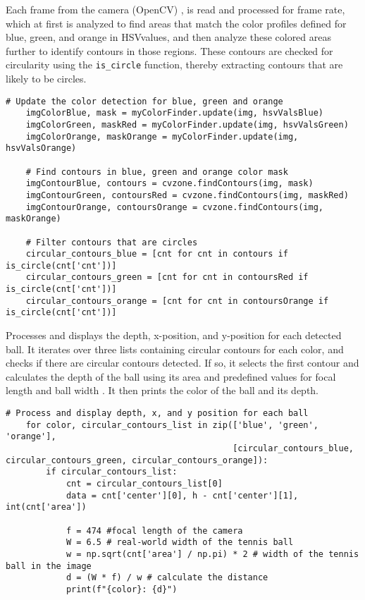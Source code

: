 Each frame from the camera (OpenCV) \cite{OpenCVDoc}, is read and processed for frame rate, which at first is analyzed to find areas that match the color profiles defined for blue, green, and orange in HSVvalues\cite{CVzoneDoc}, and then analyze these colored areas further to identify contours in those regions. These contours are checked for circularity using the \verb|is_circle| function, thereby extracting contours that are likely to be circles.  
\begin{lstlisting}[language=PythonPlus]
    # Update the color detection for blue, green and orange
    imgColorBlue, mask = myColorFinder.update(img, hsvValsBlue)
    imgColorGreen, maskRed = myColorFinder.update(img, hsvValsGreen)
    imgColorOrange, maskOrange = myColorFinder.update(img, hsvValsOrange)

    # Find contours in blue, green and orange color mask 
    imgContourBlue, contours = cvzone.findContours(img, mask)
    imgContourGreen, contoursRed = cvzone.findContours(img, maskRed)
    imgContourOrange, contoursOrange = cvzone.findContours(img, maskOrange)

    # Filter contours that are circles
    circular_contours_blue = [cnt for cnt in contours if is_circle(cnt['cnt'])]
    circular_contours_green = [cnt for cnt in contoursRed if is_circle(cnt['cnt'])]
    circular_contours_orange = [cnt for cnt in contoursOrange if is_circle(cnt['cnt'])]
\end{lstlisting}

Processes and displays the depth, x-position, and y-position for each detected ball. It iterates over three lists containing circular contours for each color, and checks if there are circular contours detected. If so, it selects the first contour and calculates the depth of the ball using its area and predefined values for focal length and ball width \cite{distanceobject}. It then prints the color of the ball and its depth.
\begin{lstlisting}[language=PythonPlus]
# Process and display depth, x, and y position for each ball
    for color, circular_contours_list in zip(['blue', 'green', 'orange'],
                                             [circular_contours_blue, circular_contours_green, circular_contours_orange]):
        if circular_contours_list:
            cnt = circular_contours_list[0]
            data = cnt['center'][0], h - cnt['center'][1], int(cnt['area'])

            f = 474 #focal length of the camera
            W = 6.5 # real-world width of the tennis ball
            w = np.sqrt(cnt['area'] / np.pi) * 2 # width of the tennis ball in the image
            d = (W * f) / w # calculate the distance
            print(f"{color}: {d}")
\end{lstlisting}

